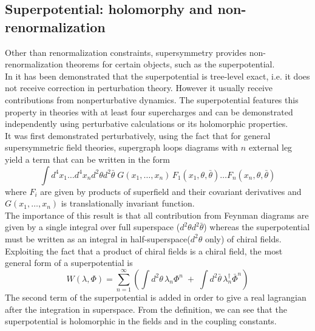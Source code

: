\subsection{Superpotential: holomorphy and non-renormalization}
\label{sec:superpotential_hol_renorm}

Other than renormalization constraints, supersymmetry provides non-renormalization theorems for certain objects, such as the superpotential. 
\\
In \cite{Grisaru:1979wc} it has been demonstrated that the superpotential is tree-level exact, i.e. it does not receive correction in perturbation theory. 
However it usually receive contributions from nonperturbative dynamics.
The superpotential features this property in theories with at least four supercharges and can be demonstrated independently using perturbative calculations or its holomorphic properties. 
\\
It was first demonstrated perturbatively, using the fact that for general supersymmetric field theories, supergraph loops diagrams with $n$ external leg yield a term that can be written in the form
\begin{equation}
\int  d^4 x_1 \dots d^4 x_n d^2 \theta d^2 \bar{\theta} \; G (x_1 , \dots , x_n) \,F_1 ( x_1, \theta, \bar{\theta}) \dots  F_n ( x_n, \theta, \bar{\theta}) 
\end{equation} 
where $F_i$ are given by products of superfield and their covariant derivatives and $G (x_1 , \dots , x_n) $ is translationally invariant function.\\
The importance of this result is that all contribution from Feynman diagrams are given by a single integral over full superspace ($d^2 \theta d^2 \bar{\theta} $) whereas the superpotential must be written as an integral in half-superspace($d^2 \theta $ only) of chiral fields.
Exploiting the fact that a product of chiral fields is a chiral field, the most general form of a superpotential is 
\begin{equation}
 W (\lambda, \Phi) = \sum_{n=1}^{\infty} \left( \int d^2 \theta \, \lambda_n \Phi^n  \; +\;  \int d^2 \bar{\theta} \, \lambda_n^{\dagger} \bar{\Phi}^n \right)
 \end{equation} 
 The second term of the superpotential is added in order to give a real lagrangian after the integration in superspace.
From the definition, we can see that the superpotential is holomorphic in the fields and in the coupling constants.
\\
